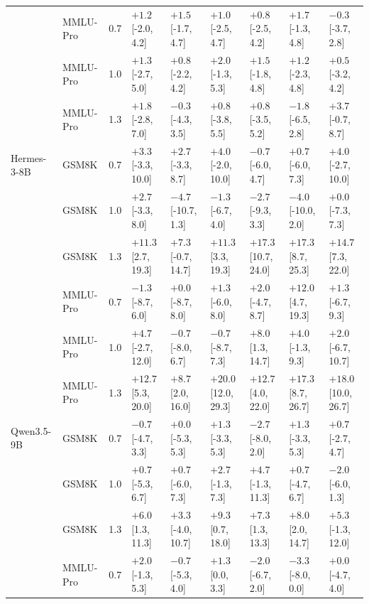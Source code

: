 \begin{tabular}{llcllllll}
 & MMLU-Pro & 0.7 & $+1.2$ [-2.0, 4.2] & $+1.5$ [-1.7, 4.7] & $+1.0$ [-2.5, 4.7] & $+0.8$ [-2.5, 4.2] & $+1.7$ [-1.3, 4.8] & $-0.3$ [-3.7, 2.8] \\
 & MMLU-Pro & 1.0 & $+1.3$ [-2.7, 5.0] & $+0.8$ [-2.2, 4.2] & $+2.0$ [-1.3, 5.3] & $+1.5$ [-1.8, 4.8] & $+1.2$ [-2.3, 4.8] & $+0.5$ [-3.2, 4.2] \\
 & MMLU-Pro & 1.3 & $+1.8$ [-2.8, 7.0] & $-0.3$ [-4.3, 3.5] & $+0.8$ [-3.8, 5.5] & $+0.8$ [-3.5, 5.2] & $-1.8$ [-6.5, 2.8] & $+3.7$ [-0.7, 8.7] \\
\midrule
Hermes-3-8B & GSM8K & 0.7 & $+3.3$ [-3.3, 10.0] & $+2.7$ [-3.3, 8.7] & $+4.0$ [-2.0, 10.0] & $-0.7$ [-6.0, 4.7] & $+0.7$ [-6.0, 7.3] & $+4.0$ [-2.7, 10.0] \\
 & GSM8K & 1.0 & $+2.7$ [-3.3, 8.0] & $-4.7$ [-10.7, 1.3] & $-1.3$ [-6.7, 4.0] & $-2.7$ [-9.3, 3.3] & $-4.0$ [-10.0, 2.0] & $+0.0$ [-7.3, 7.3] \\
 & GSM8K & 1.3 & $\mathbf{+11.3}$ [2.7, 19.3] & $+7.3$ [-0.7, 14.7] & $\mathbf{+11.3}$ [3.3, 19.3] & $\mathbf{+17.3}$ [10.7, 24.0] & $\mathbf{+17.3}$ [8.7, 25.3] & $\mathbf{+14.7}$ [7.3, 22.0] \\
 & MMLU-Pro & 0.7 & $-1.3$ [-8.7, 6.0] & $+0.0$ [-8.7, 8.0] & $+1.3$ [-6.0, 8.0] & $+2.0$ [-4.7, 8.7] & $\mathbf{+12.0}$ [4.7, 19.3] & $+1.3$ [-6.7, 9.3] \\
 & MMLU-Pro & 1.0 & $+4.7$ [-2.7, 12.0] & $-0.7$ [-8.0, 6.7] & $-0.7$ [-8.7, 7.3] & $\mathbf{+8.0}$ [1.3, 14.7] & $+4.0$ [-1.3, 9.3] & $+2.0$ [-6.7, 10.7] \\
 & MMLU-Pro & 1.3 & $\mathbf{+12.7}$ [5.3, 20.0] & $\mathbf{+8.7}$ [2.0, 16.0] & $\mathbf{+20.0}$ [12.0, 29.3] & $\mathbf{+12.7}$ [4.0, 22.0] & $\mathbf{+17.3}$ [8.7, 26.7] & $\mathbf{+18.0}$ [10.0, 26.7] \\
\midrule
Qwen3.5-9B & GSM8K & 0.7 & $-0.7$ [-4.7, 3.3] & $+0.0$ [-5.3, 5.3] & $+1.3$ [-3.3, 5.3] & $-2.7$ [-8.0, 2.0] & $+1.3$ [-3.3, 5.3] & $+0.7$ [-2.7, 4.7] \\
 & GSM8K & 1.0 & $+0.7$ [-5.3, 6.7] & $+0.7$ [-6.0, 7.3] & $+2.7$ [-1.3, 7.3] & $+4.7$ [-1.3, 11.3] & $+0.7$ [-4.7, 6.7] & $-2.0$ [-6.0, 1.3] \\
 & GSM8K & 1.3 & $\mathbf{+6.0}$ [1.3, 11.3] & $+3.3$ [-4.0, 10.7] & $\mathbf{+9.3}$ [0.7, 18.0] & $\mathbf{+7.3}$ [1.3, 13.3] & $\mathbf{+8.0}$ [2.0, 14.7] & $+5.3$ [-1.3, 12.0] \\
 & MMLU-Pro & 0.7 & $+2.0$ [-1.3, 5.3] & $-0.7$ [-5.3, 4.0] & $+1.3$ [0.0, 3.3] & $-2.0$ [-6.7, 2.0] & $-3.3$ [-8.0, 0.0] & $+0.0$ [-4.7, 4.0] \\

\end{tabular}

